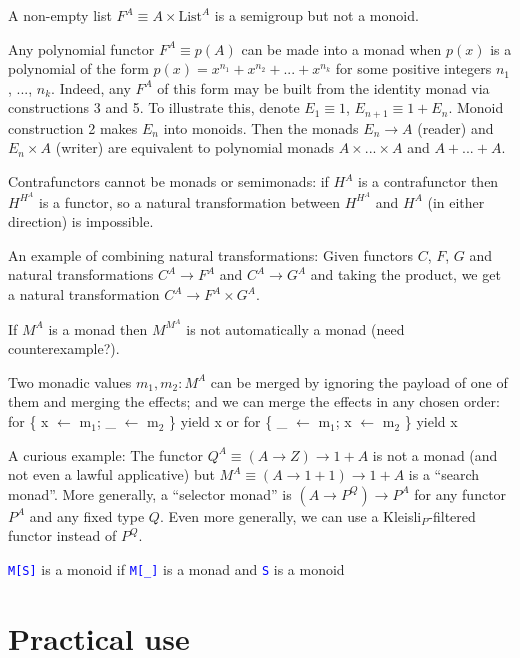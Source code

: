 \vspace{-0.2cm}A non-empty list $F^{A}\equiv A\times\text{List}^{A}$
is a semigroup but not a monoid.

Any polynomial functor $F^{A}\equiv p(A)$ can be made into a monad
when $p(x)$ is a polynomial of the form $p(x)=x^{n_{1}}+x^{n_{2}}+...+x^{n_{k}}$
for some positive integers $n_{1}$, ..., $n_{k}$. Indeed, any $F^{A}$
of this form may be built from the identity monad via constructions
3 and 5. To illustrate this, denote $E_{1}\equiv1$, $E_{n+1}\equiv1+E_{n}$.
Monoid construction 2 makes $E_{n}$ into monoids. Then the monads
$E_{n}\rightarrow A$ (reader) and $E_{n}\times A$ (writer) are equivalent
to polynomial monads $A\times...\times A$ and $A+...+A$.

Contrafunctors cannot be monads or semimonads: if $H^{A}$ is a contrafunctor
then $H^{H^{A}}$ is a functor, so a natural transformation between
$H^{H^{A}}$ and $H^{A}$ (in either direction) is impossible.

An example of combining natural transformations: Given functors $C$,
$F$, $G$ and natural transformations $C^{A}\rightarrow F^{A}$ and
$C^{A}\rightarrow G^{A}$ and taking the product, we get a natural
transformation $C^{A}\rightarrow F^{A}\times G^{A}$. 

If $M^{A}$ is a monad then $M^{M^{A}}$ is not automatically a monad
(need counterexample?).

Two monadic values $m_{1},m_{2}:M^{A}$ can be merged by ignoring
the payload of one of them and merging the effects; and we can merge
the effects in any chosen order: for \{ x $\leftarrow$ m$_{1}$;
\_ $\leftarrow$ m$_{2}$ \} yield x or for \{ \_ $\leftarrow$ m$_{1}$;
x $\leftarrow$ m$_{2}$ \} yield x 

A curious example: The functor $Q^{A}\equiv\left(A\rightarrow Z\right)\rightarrow1+A$
is not a monad (and not even a lawful applicative) but $M^{A}\equiv\left(A\rightarrow1+1\right)\rightarrow1+A$
is a ``search monad''. More generally, a ``selector monad'' is
$\left(A\rightarrow P^{Q}\right)\rightarrow P^{A}$ for any functor
$P^{A}$ and any fixed type $Q$. Even more generally, we can use
a Kleisli$_{P}$-filtered functor instead of $P^{Q}$.

\texttt{\textcolor{blue}{\footnotesize{}M{[}S{]}}} is a monoid if
\texttt{\textcolor{blue}{\footnotesize{}M{[}\_{]}}} is a monad and
\texttt{\textcolor{blue}{\footnotesize{}S}} is a monoid

\section{Practical use}

